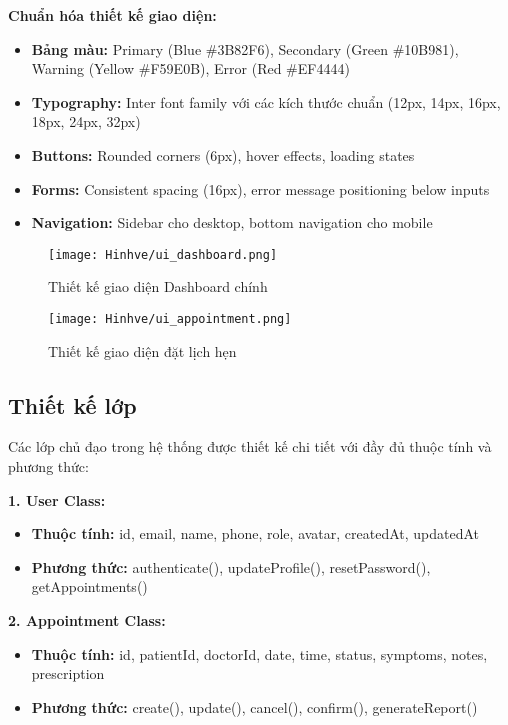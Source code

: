 \documentclass[../DoAn.tex]{subfiles}
\begin{document}
\textbf{Chuẩn hóa thiết kế giao diện:}
\begin{itemize}
    \item \textbf{Bảng màu:} Primary (Blue \#3B82F6), Secondary (Green \#10B981), Warning (Yellow \#F59E0B), Error (Red \#EF4444)
    \item \textbf{Typography:} Inter font family với các kích thước chuẩn (12px, 14px, 16px, 18px, 24px, 32px)
    \item \textbf{Buttons:} Rounded corners (6px), hover effects, loading states
    \item \textbf{Forms:} Consistent spacing (16px), error message positioning below inputs
    \item \textbf{Navigation:} Sidebar cho desktop, bottom navigation cho mobile
\end{itemize}

\begin{figure}[H]
    \centering
    \texttt{[image: Hinhve/ui\_dashboard.png]}
    \caption{Thiết kế giao diện Dashboard chính}
    \label{fig:ui_dashboard}
\end{figure}

\begin{figure}[H]
    \centering
    \texttt{[image: Hinhve/ui\_appointment.png]}
    \caption{Thiết kế giao diện đặt lịch hẹn}
    \label{fig:ui_appointment}
\end{figure}

\subsection{Thiết kế lớp}

Các lớp chủ đạo trong hệ thống được thiết kế chi tiết với đầy đủ thuộc tính và phương thức:

\textbf{1. User Class:}
\begin{itemize}
    \item \textbf{Thuộc tính:} id, email, name, phone, role, avatar, createdAt, updatedAt
    \item \textbf{Phương thức:} authenticate(), updateProfile(), resetPassword(), getAppointments()
\end{itemize}

\textbf{2. Appointment Class:}
\begin{itemize}
    \item \textbf{Thuộc tính:} id, patientId, doctorId, date, time, status, symptoms, notes, prescription
    \item \textbf{Phương thức:} create(), update(), cancel(), confirm(), generateReport()
\end{itemize}
\end{document}
